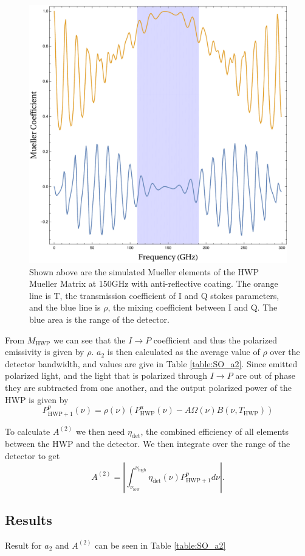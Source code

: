 \documentclass{article}
\theoremstyle{remark}
\newcommand{\tab}{\hspace*{2em}}
\renewcommand{\t}[1]{\text{#1}}
\newcommand{\A}[1]{A^{(#1)}}
\newcommand{\ip}{$I\rightarrow P$ }
\newcommand{\abs}[1]{\left|#1\right|}%
\begin{document}
\begin{figure}[t!]
	\centering
  \includegraphics[width=.6\linewidth]{images/Mueller_150GHz.pdf}
  \caption{Shown above are the simulated Mueller elements of the HWP Mueller Matrix at 150GHz with anti-reflective coating. 
  	The orange line is T, the transmission coefficient of I and Q stokes parameters, and the blue line is 
  	$\rho$, the mixing coefficient between I and Q. The blue area is the range of the detector.}
  \label{fig:Mueller_Elements}
\end{figure}

\tab From $M_\t{HWP}$ we can see that the \ip coefficient and thus the polarized emissivity is given by $\rho$. 
$a_2$ is then calculated as the average value of $\rho$ over the detector bandwidth, and values are give in Table \ref{table:SO_a2}.
Since emitted polarized light, and the light that is polarized through \ip are out of phase they are subtracted from one another, and the output polarized power of the HWP is given by
\[
P^p_{\t{HWP} + 1}(\nu)= \rho(\nu) \left(P^u_\t{HWP}(\nu) - A \Omega(\nu) B(\nu, T_\t{HWP}) \right) 	
\]

\tab To calculate $\A2$ we then need $\eta_\t{det}$, the combined efficiency of all elements between the HWP and the detector.
We then integrate over the range of the detector to get
\[
\A2 = \abs{ \int_{\nu_\t{low}}^{\nu_\t{high}} \eta_\t{det}(\nu) P^p_{\t{HWP} + 1} d\nu }.
\]




\subsection{Results}


Result for $a_2$ and $\A2$ can be seen in Table \ref{table:SO_a2}
\end{document}
